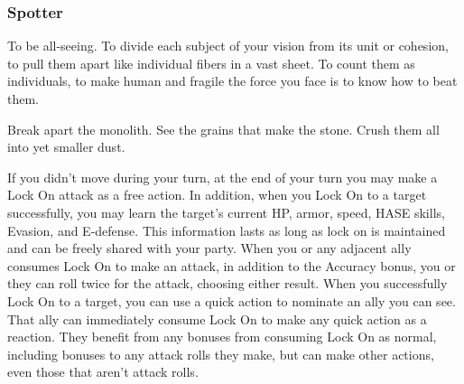 \subsubsection{Spotter}

\begin{talent}
{To be all-seeing. To divide each subject of your vision from its unit or cohesion, to pull them apart like individual fibers in a vast sheet. To count them as individuals, to make human and fragile the force you face is to know how to beat them.

Break apart the monolith. See the grains that make the stone. Crush them all into yet smaller dust.} 

If you didn’t move during your turn, at the end of your turn you may make a Lock On attack as a free action. In addition, when you Lock On to a target successfully, you may learn the target’s current HP, armor, speed, HASE skills, Evasion, and E-defense. This information lasts as long as lock on is maintained and can be freely shared with your party. 
When you or any adjacent ally consumes Lock On to make an attack, in addition to the Accuracy bonus, you or they can roll twice for the attack, choosing either result. 
When you successfully Lock On to a target, you can use a quick action to nominate an ally you can see. That ally can immediately consume Lock On to make any quick action as a reaction. They benefit from any bonuses from consuming Lock On as normal, including bonuses to any attack rolls they make, but can make other actions, even those that aren’t attack rolls.
\end{talent}